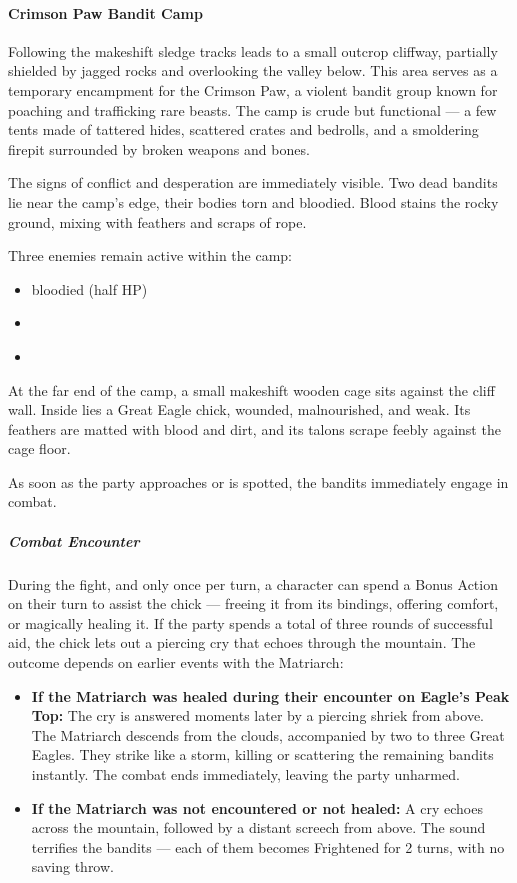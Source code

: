 \paragraph*{Crimson Paw Bandit Camp}
{\entryfont Following the makeshift sledge tracks leads to a small outcrop cliffway, partially shielded by jagged rocks and overlooking the valley below. This area serves as a temporary encampment for the Crimson Paw, a violent bandit group known for poaching and trafficking rare beasts. The camp is crude but functional — a few tents made of tattered hides, scattered crates and bedrolls, and a smoldering firepit surrounded by broken weapons and bones.

The signs of conflict and desperation are immediately visible. Two dead bandits lie near the camp's edge, their bodies torn and bloodied. Blood stains the rocky ground, mixing with feathers and scraps of rope.

Three enemies remain active within the camp:
\begin{itemize}
	\item bloodied (half HP) \hyperref[monster:BanditBerserker]{}
	\item \hyperref[monster:BanditDruid]{}
	\item \hyperref[monster:BanditCaptain]{}
\end{itemize}
At the far end of the camp, a small makeshift wooden cage sits against the cliff wall. Inside lies a Great Eagle chick, wounded, malnourished, and weak. Its feathers are matted with blood and dirt, and its talons scrape feebly against the cage floor.

As soon as the party approaches or is spotted, the bandits immediately engage in combat.}
\subparagraph*{Combat Encounter}
{\entryfont During the fight, and only once per turn, a character can spend a Bonus Action on their turn to assist the chick — freeing it from its bindings, offering comfort, or magically healing it. If the party spends a total of three rounds of successful aid, the chick lets out a piercing cry that echoes through the mountain. The outcome depends on earlier events with the Matriarch:
\begin{itemize}
	\item \textbf{If the Matriarch was healed during their encounter on Eagle's Peak Top:}
	The cry is answered moments later by a piercing shriek from above. The Matriarch descends from the clouds, accompanied by two to three Great Eagles. They strike like a storm, killing or scattering the remaining bandits instantly. The combat ends immediately, leaving the party unharmed.
	\item \textbf{If the Matriarch was not encountered or not healed:}
	A cry echoes across the mountain, followed by a distant screech from above. The sound terrifies the bandits — each of them becomes Frightened for 2 turns, with no saving throw.
\end{itemize}}
